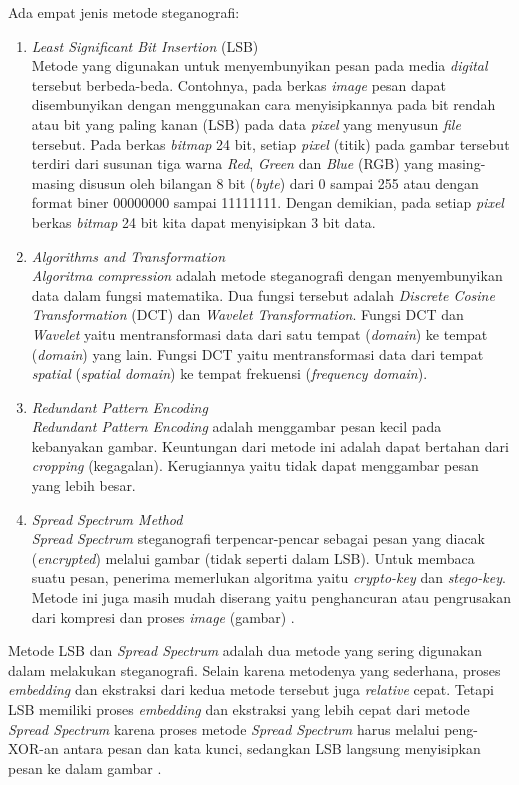 	Ada empat jenis metode steganografi:
	\begin{enumerate}
		\item \emph{Least Significant Bit Insertion} (LSB)\\
		Metode yang digunakan untuk menyembunyikan pesan pada media \emph{digital} tersebut berbeda-beda. Contohnya, pada berkas \emph{image} pesan dapat disembunyikan dengan menggunakan cara menyisipkannya pada bit rendah atau bit yang paling kanan (LSB) pada data \emph{pixel} yang menyusun \emph{file} tersebut. Pada berkas \emph{bitmap} 24 bit, setiap \emph{pixel} (titik) pada gambar tersebut terdiri dari susunan tiga warna \emph{Red}, \emph{Green} dan \emph{Blue} (RGB) yang masing-masing disusun oleh bilangan 8 bit (\emph{byte}) dari 0 sampai 255 atau dengan format biner 00000000 sampai 11111111. Dengan demikian, pada setiap \emph{pixel} berkas \emph{bitmap} 24 bit kita dapat menyisipkan 3 bit data. 
		\item \emph{Algorithms and Transformation}\\
		\emph{Algoritma compression} adalah metode steganografi dengan menyembunyikan data dalam fungsi matematika. Dua fungsi tersebut adalah \emph{Discrete Cosine Transformation} (DCT) dan \emph{Wavelet Transformation}. Fungsi DCT dan \emph{Wavelet} yaitu mentransformasi data dari satu tempat (\emph{domain}) ke tempat (\emph{domain}) yang lain. Fungsi DCT yaitu mentransformasi data dari tempat \emph{spatial} (\emph{spatial domain}) ke tempat frekuensi (\emph{frequency domain}).
		\item \emph{Redundant Pattern Encoding}\\
		\emph{Redundant Pattern Encoding} adalah menggambar pesan kecil pada kebanyakan gambar. Keuntungan dari metode ini adalah dapat bertahan dari \emph{cropping} (kegagalan). Kerugiannya yaitu tidak dapat menggambar pesan yang lebih besar.
		\item \emph{Spread Spectrum Method}\\
		\emph{Spread Spectrum} steganografi terpencar-pencar sebagai pesan yang diacak (\emph{encrypted}) melalui gambar (tidak seperti dalam LSB). Untuk membaca suatu pesan, penerima memerlukan algoritma yaitu \emph{crypto-key} dan \emph{stego-key}. Metode ini juga masih mudah diserang yaitu penghancuran atau pengrusakan dari kompresi dan proses \emph{image} (gambar) \cite{wikipedia1}.
	\end{enumerate}

	Metode LSB dan \emph{Spread Spectrum} adalah dua metode yang sering digunakan dalam melakukan steganografi. Selain karena metodenya yang sederhana, proses \emph{embedding} dan ekstraksi dari kedua metode tersebut juga \emph{relative} cepat\cite{pavani}. Tetapi LSB memiliki proses \emph{embedding} dan ekstraksi yang lebih cepat dari metode \emph{Spread Spectrum} karena proses metode \emph{Spread Spectrum} harus melalui peng-XOR-an antara pesan dan kata kunci, sedangkan LSB langsung menyisipkan pesan ke dalam gambar \cite{pakereng}.
	

